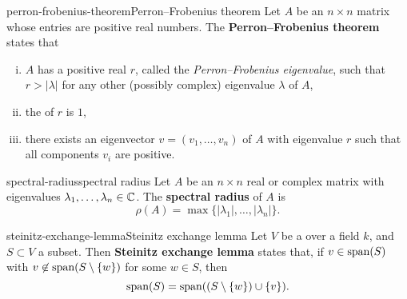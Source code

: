 \begin{topic}{perron-frobenius-theorem}{Perron--Frobenius theorem}
    Let $A$ be an $n \times n$ matrix whose entries are positive real numbers. The \textbf{Perron--Frobenius theorem} states that
    \begin{enumerate}[(i)]
        \item $A$ has a positive real  $r$, called the \textit{Perron--Frobenius eigenvalue}, such that $r > |\lambda|$ for any other (possibly complex) eigenvalue $\lambda$ of $A$,
        \item the  of $r$ is $1$,
        \item there exists an eigenvector $v = (v_1, \ldots, v_n)$ of $A$ with eigenvalue $r$ such that all components $v_i$ are positive.
    \end{enumerate}
\end{topic}

\begin{topic}{spectral-radius}{spectral radius}
    Let $A$ be an $n \times n$ real or complex matrix with eigenvalues $\lambda_1, \ldots, \lambda_n \in \mathbb{C}$. The \textbf{spectral radius} of $A$ is 
    \[ \rho(A) = \max \{ |\lambda_1|, \ldots, |\lambda_n| \} . \]
\end{topic}

\begin{topic}{steinitz-exchange-lemma}{Steinitz exchange lemma}
    Let $V$ be a  over a field $k$, and $S \subset V$ a subset. Then \textbf{Steinitz exchange lemma} states that, if $v \in \textup{span}(S)$ with $v \not\in \textup{span}(S \setminus \{ w \})$ for some $w \in S$, then
    \[ \textup{span}(S) = \textup{span}((S \setminus \{ w \}) \cup \{ v \}) . \]
\end{topic}
